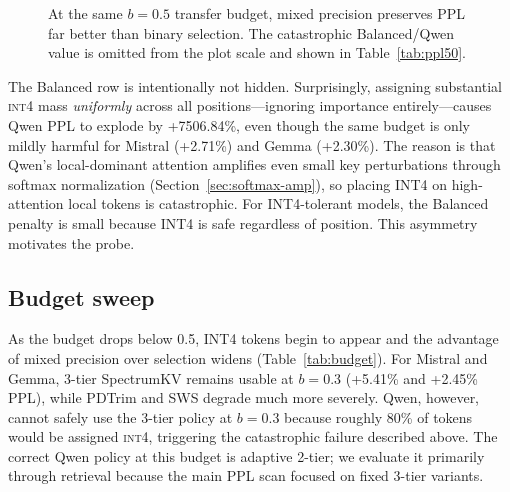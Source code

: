\documentclass[11pt]{article}
\newcommand{\method}{SpectrumKV}
\newcommand{\budget}{b}
\newcommand{\pct}{\%}
\newcommand{\intiv}{\textsc{int4}}
\theoremstyle{plain}
\theoremstyle{definition}
\begin{document}
\begin{figure}[t]
\centering
{}
\caption{At the same $\budget=0.5$ transfer budget, mixed precision preserves PPL far better than binary selection.  The catastrophic Balanced/Qwen value is omitted from the plot scale and shown in Table~\ref{tab:ppl50}.}
\label{fig:ppl50}
\end{figure}

The Balanced row is intentionally not hidden.  Surprisingly, assigning substantial \intiv{} mass \emph{uniformly} across all positions---ignoring importance entirely---causes Qwen PPL to explode by +7506.84\pct{}, even though the same budget is only mildly harmful for Mistral (+2.71\pct{}) and Gemma (+2.30\pct{}).  The reason is that Qwen's local-dominant attention amplifies even small key perturbations through softmax normalization (Section~\ref{sec:softmax-amp}), so placing INT4 on high-attention local tokens is catastrophic.  For INT4-tolerant models, the Balanced penalty is small because INT4 is safe regardless of position.  This asymmetry motivates the probe.

\subsection{Budget sweep}
\label{sec:rq8}

As the budget drops below 0.5, INT4 tokens begin to appear and the advantage of mixed precision over selection widens (Table~\ref{tab:budget}).  For Mistral and Gemma, 3-tier \method{} remains usable at $\budget=0.3$ (+5.41\pct{} and +2.45\pct{} PPL), while PDTrim and SWS degrade much more severely.  Qwen, however, cannot safely use the 3-tier policy at $\budget=0.3$ because roughly 80\pct{} of tokens would be assigned \intiv{}, triggering the catastrophic failure described above.  The correct Qwen policy at this budget is adaptive 2-tier; we evaluate it primarily through retrieval because the main PPL scan focused on fixed 3-tier variants.
\end{document}

